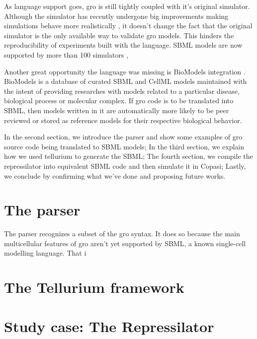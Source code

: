 \documentclass[12pt]{article}
\begin{document}
    As language support goes, gro is still tightly coupled with it's original simulator. Although the simulator has 
    recently undergone big improvements making simulations behave more realistically \cite{Gutirrez2017}, it doesn't 
    change the fact that the original simulator is the only available way to validate gro models. This hinders the 
    reproducibility of experiments built with the language. SBML models are now supported by more than 100 simulators \cite{Hucka2007},
    
    Another great opportunity the language was missing is BioModels integration \cite{LeNovere2006}. BioModels is a 
    database of curated SBML and CellML models maintained with the intent of providing researches with models related
    to a particular disease, biological process or molecular complex. If gro code is to be translated into SBML, then
    models written in it are automatically more likely to be peer reviewed or stored as reference models for their 
    respective biological behavior.

    In the second section, we introduce the parser and show some examples of gro source code being translated to SBML
    models; In the third section, we explain how we used tellurium to generate the SBML; The fourth section, we 
    compile the repressilator into equivalent SBML code and then simulate it in Copasi; Lastly, we conclude by 
    confirming what we've done and proposing future works.
    
    
\section{The parser}
    The parser recognizes a subset of the gro syntax. It does so because the main multicellular features of gro aren't yet supported by SBML, a known single-cell modelling language. That i

\section{The Tellurium framework}
    \lipsum[1]

\section{Study case: The Repressilator}
    \lipsum[1]
\end{document}
